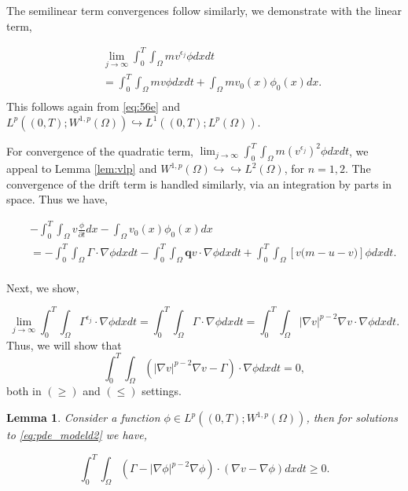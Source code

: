 \documentclass[10pt]{amsart}
\theoremstyle{plain}
\newtheorem{lemma}[theorem]{Lemma}
\theoremstyle{definition}
\begin{document}
The semilinear term convergences follow similarly, we demonstrate with the linear term,

\begin{eqnarray}
 && \lim_{j \rightarrow \infty} \int^{T}_{0} \int_{\Omega}  m v^{\epsilon_{j}} \phi dx dt \nonumber \\
 && =\int^{T}_{0} \int_{\Omega} m v \phi dx dt + \int_{\Omega}m v_{0}(x)\phi_{0}(x)dx . \  \nonumber \\
\end{eqnarray}
%
This follows again from \eqref{eq:56e} and $L^{p}((0,T);W^{1,p}(\Omega)) \hookrightarrow L^{1}((0,T);L^{p}(\Omega))$.

For convergence of the quadratic term, $\lim_{j \rightarrow \infty} \int^{T}_{0} \int_{\Omega}  m (v^{\epsilon_{j}})^{2} \phi dx dt$, we appeal to Lemma \ref{lem:vlp} and $W^{1,p}(\Omega) \hookrightarrow \hookrightarrow L^{2}(\Omega) $, for $n=1,2$. The convergence of the drift term is handled similarly, via an integration by parts in space. Thus we have,

\begin{eqnarray}
    && - \int^{T}_{0}\int_{\Omega} v \frac{\phi }{\partial t}  dx  - \int_{\Omega}v_{0}(x)\phi_{0}(x)dx \nonumber \\
    && = - \int^{T}_{0}\int_{\Omega} \Gamma \cdot \nabla \phi dx dt  - \int^{T}_{0}\int_{\Omega}\textbf{q}  v \cdot \nabla \phi dx dt + \int^{T}_{0}\int_{\Omega}[v\Big(m-u-v\Big)]\phi dx dt. \nonumber \\
   \end{eqnarray}

Next, we show,

\begin{equation}
    \lim_{j \rightarrow \infty} \int^{T}_{0}\int_{\Omega}  \Gamma^{\epsilon_{j}} \cdot \nabla \phi dx dt = \int^{T}_{0}\int_{\Omega}  \Gamma \cdot \nabla \phi dx dt = 
    \int^{T}_{0}\int_{\Omega} |\nabla v|^{p-2} \nabla v \cdot \nabla \phi dx dt .
\end{equation}
%
Thus, we will show that 
\begin{equation}
\label{eq:11el}
 \int^{T}_{0}\int_{\Omega} (|\nabla v|^{p-2} \nabla v - \Gamma ) \cdot \nabla \phi dx dt = 0,
\end{equation}
both in $(\geq)$ and $(\leq)$ settings.

\begin{lemma}
Consider a function $\phi \in L^{p}((0,T);W^{1,p}(\Omega))$, then for solutions to \eqref{eq:pde_modeld2} we have,

\begin{equation}
\label{eq:iiel}
     \int^{T}_{0}\int_{\Omega} ( \Gamma - |\nabla \phi|^{p-2} \nabla \phi  ) \cdot (\nabla v - \nabla \phi )dx dt \geq  0.
\end{equation}
    
\end{lemma}
\end{document}
